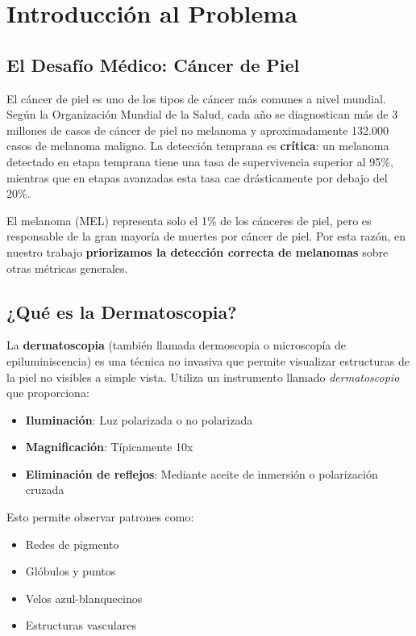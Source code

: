 \documentclass[12pt,a4paper]{article}
\begin{document}
\section{Introducción al Problema}

\subsection{El Desafío Médico: Cáncer de Piel}

El cáncer de piel es uno de los tipos de cáncer más comunes a nivel mundial. Según la Organización Mundial de la Salud, cada año se diagnostican más de 3 millones de casos de cáncer de piel no melanoma y aproximadamente 132.000 casos de melanoma maligno. La detección temprana es \textbf{crítica}: un melanoma detectado en etapa temprana tiene una tasa de supervivencia superior al 95\%, mientras que en etapas avanzadas esta tasa cae drásticamente por debajo del 20\%.

\begin{warningbox}
El melanoma (MEL) representa solo el 1\% de los cánceres de piel, pero es responsable de la gran mayoría de muertes por cáncer de piel. Por esta razón, en nuestro trabajo \textbf{priorizamos la detección correcta de melanomas} sobre otras métricas generales.
\end{warningbox}

\subsection{¿Qué es la Dermatoscopia?}

La \textbf{dermatoscopia} (también llamada dermoscopia o microscopía de epiluminiscencia) es una técnica no invasiva que permite visualizar estructuras de la piel no visibles a simple vista. Utiliza un instrumento llamado \textit{dermatoscopio} que proporciona:

\begin{itemize}
    \item \textbf{Iluminación}: Luz polarizada o no polarizada
    \item \textbf{Magnificación}: Típicamente 10x
    \item \textbf{Eliminación de reflejos}: Mediante aceite de inmersión o polarización cruzada
\end{itemize}

Esto permite observar patrones como:
\begin{itemize}
    \item Redes de pigmento
    \item Glóbulos y puntos
    \item Velos azul-blanquecinos
    \item Estructuras vasculares
\end{itemize}
\end{document}
